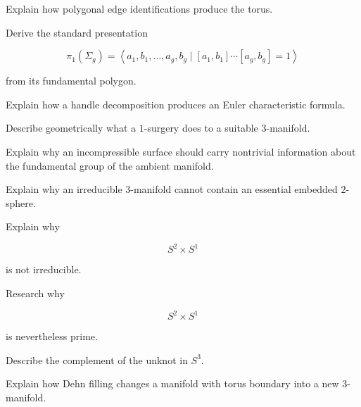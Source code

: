 \begin{exercise}[3]
Explain how polygonal edge identifications produce the torus.
\end{exercise}

\begin{exercise}[3]
Derive the standard presentation

\[
\pi_1(\Sigma_g)
=
\left\langle
a_1,b_1,\ldots,a_g,b_g
\mid
[a_1,b_1]\cdots[a_g,b_g]=1
\right\rangle
\]

from its fundamental polygon.
\end{exercise}

\begin{exercise}[3]
Explain how a handle decomposition produces an Euler characteristic formula.
\end{exercise}

\begin{exercise}[3]
Describe geometrically what a \(1\)-surgery does to a suitable
\(3\)-manifold.
\end{exercise}

\begin{exercise}[3]
Explain why an incompressible surface should carry nontrivial information
about the fundamental group of the ambient manifold.
\end{exercise}

\begin{exercise}[3]
Explain why an irreducible \(3\)-manifold cannot contain an essential
embedded \(2\)-sphere.
\end{exercise}

\begin{exercise}[3]
Explain why

\[
S^2\times S^1
\]

is not irreducible.
\end{exercise}

\begin{exercise}[3]
Research why

\[
S^2\times S^1
\]

is nevertheless prime.
\end{exercise}

\begin{exercise}[3]
Describe the complement of the unknot in \(S^3\).
\end{exercise}

\begin{exercise}[3]
Explain how Dehn filling changes a manifold with torus boundary into a new
\(3\)-manifold.
\end{exercise}

